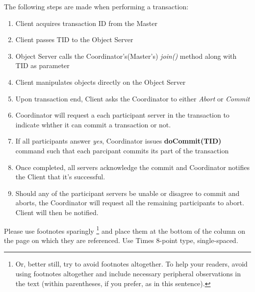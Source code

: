 \documentclass[times, 10pt,twocolumn]{article}
\begin{document}
The following steps are made when performing a transaction: 
\begin{enumerate}
\item Client acquires transaction ID from the Master
\item Client passes TID to the Object Server
\item Object Server calls the Coordinator's(Master's) {\it join()} method along with TID as parameter
\item Client manipulates objects directly on the Object Server
\item Upon transaction end, Client asks the Coordinator to either {\it Abort} or {\it Commit} 
\item Coordinator will request a each participant server in the transaction to indicate whther it can commit a transaction or not.
\item If all participants answer {\it yes}, Coordinator issues {\bf doCommit(TID)} command such that each parcipant commits its part of the transaction
\item Once completed, all servers acknowledge the commit and Coordinator notifies the Client that it's successful.
\item Should any of the participant servers be unable or disagree to commit and aborts, the Coordinator will request all the remaining participants to abort. Client will then be notified.
\end{enumerate}



Please use footnotes sparingly%
\footnote
   {%
     Or, better still, try to avoid footnotes altogether.  To help your 
     readers, avoid using footnotes altogether and include necessary 
     peripheral observations in the text (within parentheses, if you 
     prefer, as in this sentence).
   }
and place them at the bottom of the column on the page on which they are 
referenced. Use Times 8-point type, single-spaced.






\end{document}
